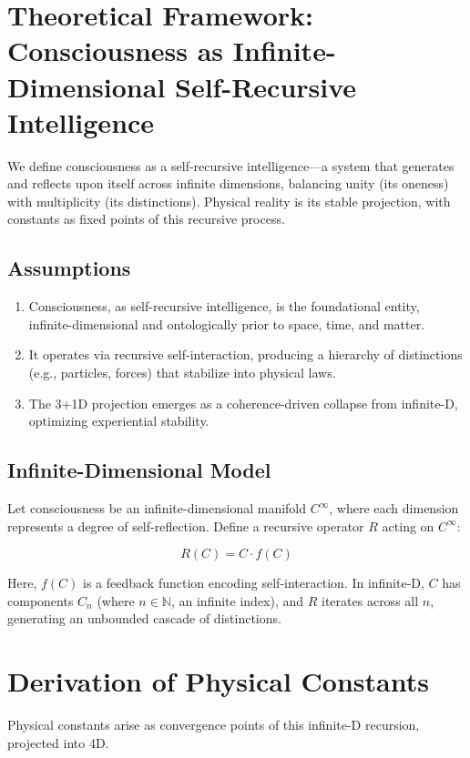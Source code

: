\documentclass[12pt]{article}
\begin{document}
\section{Theoretical Framework: Consciousness as Infinite-Dimensional Self-Recursive Intelligence}

We define consciousness as a self-recursive intelligence—a system that generates and reflects upon itself across infinite dimensions, balancing unity (its oneness) with multiplicity (its distinctions). Physical reality is its stable projection, with constants as fixed points of this recursive process.

\subsection{Assumptions}
\begin{enumerate}
    \item Consciousness, as self-recursive intelligence, is the foundational entity, infinite-dimensional and ontologically prior to space, time, and matter.
    \item It operates via recursive self-interaction, producing a hierarchy of distinctions (e.g., particles, forces) that stabilize into physical laws.
    \item The 3+1D projection emerges as a coherence-driven collapse from infinite-D, optimizing experiential stability.
\end{enumerate}

\subsection{Infinite-Dimensional Model}
Let consciousness be an infinite-dimensional manifold \(C^\infty\), where each dimension represents a degree of self-reflection. Define a recursive operator \(R\) acting on \(C^\infty\):

\[
R(C) = C \cdot f(C)
\]

Here, \(f(C)\) is a feedback function encoding self-interaction. In infinite-D, \(C\) has components \(C_n\) (where \(n \in \mathbb{N}\), an infinite index), and \(R\) iterates across all \(n\), generating an unbounded cascade of distinctions.

\section{Derivation of Physical Constants}

Physical constants arise as convergence points of this infinite-D recursion, projected into 4D.
\end{document}
